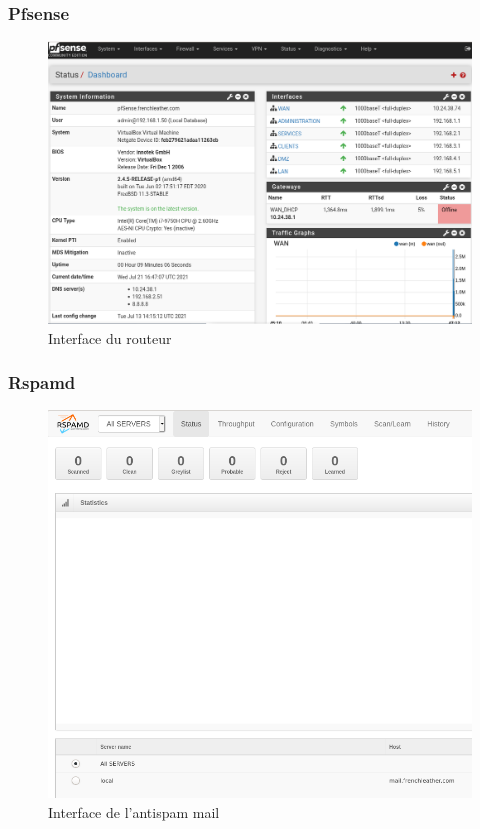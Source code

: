 \documentclass{beamer}
\begin{document}
		\begin{frame}
			\frametitle{Pfsense}
			\begin{center}
				\begin{figure}
					\includegraphics[scale=.24]{pfsense.png}
					\caption{Interface du routeur}
				\end{figure}
			\end{center}
		\end{frame}
		\begin{frame}
			\frametitle{Rspamd}
			\begin{center}
				\begin{figure}
					\includegraphics[scale=.25]{rspamd.png}
					\caption{Interface de l'antispam mail}
				\end{figure}
			\end{center}
		\end{frame}
\end{document}
